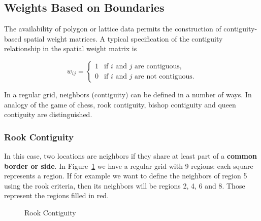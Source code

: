 \documentclass[english,12pt]{book}\usepackage[]{graphicx}\usepackage[]{xcolor}
\begin{document}
\subsection{Weights Based on Boundaries}

The availability of polygon or lattice data permits the construction of contiguity-based spatial weight matrices. A typical specification of the contiguity relationship in the spatial weight matrix is

\begin{equation*}
  w_{ij}= 
   \begin{cases}
      1 & \mbox{if $i$ and $j$ are contiguous,} \\ 
      0 & \mbox{if $i$ and $j$ are not contiguous.} 
   \end{cases}
\end{equation*}

In a regular grid, neighbors (contiguity) can be defined in a number of ways. In analogy of the game of chess, rook contiguity, bishop contiguity and queen contiguity are distinguished.

\subsubsection{Rook Contiguity}

In this case, two locations are neighbors if they share at least part of a \textbf{common border or side}. In Figure~\ref{fig:Rook_cont_grid} we have a regular grid with 9 regions: each square represents a region. If for example we want to define the neighbors of region 5 using the rook criteria, then its neighbors will be regions 2, 4, 6 and 8. Those represent the regions filled in red. 

\begin{figure}[h]
\caption{Rook Contiguity}
\label{fig:Rook_cont_grid}
\centering
{}
\end{figure}
\end{document}
